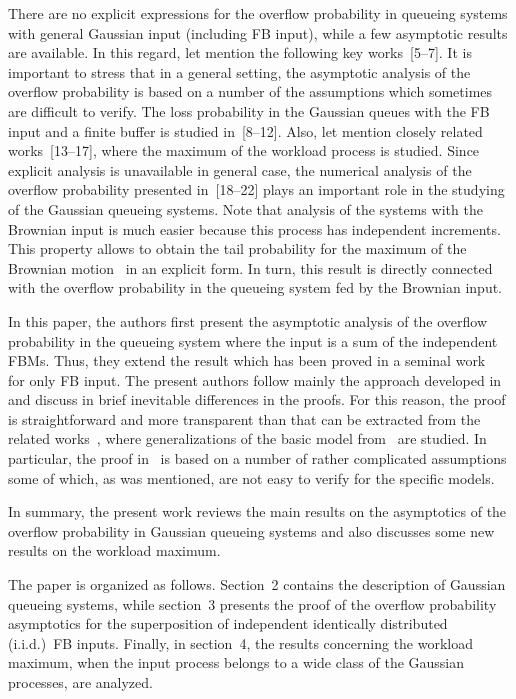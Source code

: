 \begin{multicols}{2}
There are  no explicit expressions for the overflow probability in
queueing  systems with general Gaussian input (including FB input),
while   a few   asymptotic results    are available. In this regard,
let  mention the following key works~[5--7].
It is important to stress that in a general setting, the asymptotic
analysis of the overflow probability is
 based on a number of the assumptions which sometimes are  difficult
to verify. The loss probability in the Gaussian queues with the FB
input  and a finite buffer  is  studied in~[8--12]. Also,  let mention  closely related
 works~[13--17], where the maximum of the
workload process is studied.  Since explicit analysis is
unavailable in general case, the numerical analysis of the
overflow probability  presented in~[18--22]  plays an important
role in the studying of the Gaussian queueing systems. Note that
analysis of the systems with the Brownian input is much easier
because this process has independent increments. This property
allows to obtain the tail probability  for the maximum of the
Brownian motion~\cite{Takacs} in an explicit form. In turn, this
result is directly connected with the overflow probability in the
queueing system fed by the Brownian input.

In this paper, the authors first present the asymptotic analysis of the
overflow probability in the  queueing system where the input is a
sum of the independent FBMs. Thus, they extend the result which has
been proved in a seminal work~\cite{Duffield} for   only FB input.
The present authors follow  mainly the approach developed in~\cite{Duffield} and
discuss in brief  inevitable differences in the proofs. For this
reason, the  proof is straightforward and more transparent than that
can be extracted from  the related works~\cite{Debicki2,Duffy},
where generalizations of the basic model from~\cite{Duffield} are
studied. In particular,  the proof in~\cite{Duffy}
is based on a number of rather complicated  assumptions some of
which, as was mentioned, are not easy to verify for the specific
models.

In summary, the present work  reviews the main  results on the
asymptotics of the overflow probability  in Gaussian  queueing
systems
and also discusses some new results on the workload maximum.

The  paper is organized as follows.  Section~2 contains the description
of Gaussian queueing systems, while section~3 presents the proof of the
overflow probability asymptotics for the
superposition of independent identically distributed  (i.i.d.)\
FB inputs.  Finally, in section~4, the  results concerning the workload
maximum,  when  the input process belongs to  a wide class of the
Gaussian processes, are  analyzed.


\end{multicols}
